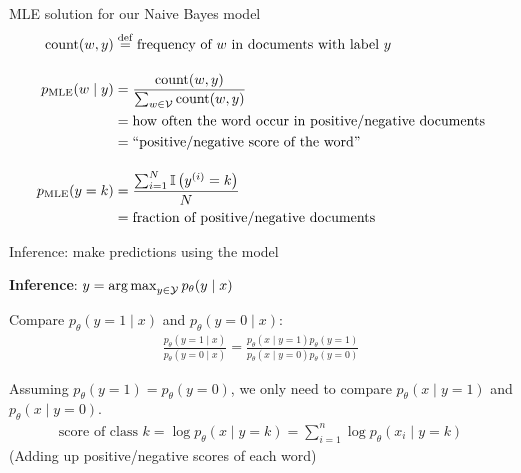 \documentclass[usenames,dvipsnames,notes,11pt,aspectratio=169]{beamer}
\newcommand{\pdfnote}[1]{}
\begin{document}

\begin{frame}
    {MLE solution for our Naive Bayes model}
    \begin{align*}
        \text{count}(w, y) &\stackrel{\rm def}{=} \text{frequency of $w$ in documents with label $y$}\\[1em]
        p_{\text{MLE}}(w\mid y) &= \frac{\text{count}(w, y)}{\sum_{w\in\mathcal{V}}\text{count}(w, y)}\\
        &= \text{how often the word occur in positive/negative documents}\\
        &= \text{``positive/negative score of the word''}\\[1em]
        p_{\text{MLE}}(y=k) &= \frac{\sum_{i=1}^N \mathbb{I}\left( y^{(i)}=k \right)}{N}\\
        &= \text{fraction of positive/negative documents}
    \end{align*}

\end{frame}

\begin{frame}
    {Inference: make predictions using the model}

    \textbf{Inference}: $y=\operatorname*{arg\,max}_{y\in\mathcal{Y}} p_\theta(y\mid x)$ 

    \medskip
    \pause
    Compare $p_\theta(y=1\mid x)$ and $p_\theta(y=0\mid x)$:
    \begin{align*}
        \frac{p_\theta(y=1\mid x)}{p_\theta(y=0\mid x)} = 
        \frac{p_\theta(x\mid y=1)p_\theta(y=1)}{p_\theta(x\mid y=0)p_\theta(y=0)}
    \end{align*}

    \pause
    Assuming $p_\theta(y=1)=p_\theta(y=0)$, we only need to compare $p_\theta(x\mid y=1)$ and $p_\theta(x\mid y=0)$.
    \begin{align*}
        \text{score of class $k$} = \log p_\theta(x \mid y=k) = \sum_{i=1}^n \log p_\theta(x_i \mid y=k) 
    \end{align*}
    (Adding up positive/negative scores of each word)
\end{frame}
\end{document}
